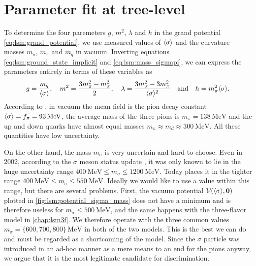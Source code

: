\section{Parameter fit at tree-level}
\label{sec:lsm:parameter_fit}

To determine the four paremeters $g$, $m^2$, $\lambda$ and $h$ in the grand potential \eqref{eq:lsm:grand_potential},
we use measured values of $\langle \sigma \rangle$ and the curvature masses $ m_\sigma$, $m_\pi$ and $m_q$ in vacuum.
Inverting equations \eqref{eq:lsm:ground_state_implicit} and \eqref{eq:lsm:mass_sigmapi},
we can express the parameters entirely in terms of these variables as
\begin{equation}
	g       = \frac{m_q}{\avg{\sigma}}, \quad %
	m^2     = \frac{3m_\pi^2 - m_\sigma^2}{2}, \quad %
	\lambda = \frac{3 m_\sigma^2 - 3 m_\pi^2}{\avg{\sigma}^2} %
	\quad \text{and} \quad
	h       = m_\pi^2 \avg{\sigma}. %
\label{eq:lsm:parameters}
\end{equation}
According to \cite{ref:pdg_review_2021}, in vacuum the mean field is the pion decay constant $\langle \sigma \rangle = f_\pi = \SI{93}{\mega\electronvolt}$,
the average mass of the three pions is $m_\pi = \SI{138}{\mega\electronvolt}$
and the up and down quarks have almost equal masses $m_u \approx m_d \approx \SI{300}{\mega\electronvolt}$.
All these quantities have low uncertainty.


On the other hand, the mass $m_\sigma$ is very uncertain and hard to choose.
Even in 2002, according to the $\sigma$ meson status update \cite{ref:sigma_meson_status},
it was only known to lie in the huge uncertainty range $\SI{400}{\mega\electronvolt} \leq m_\sigma \leq \SI{1200}{\mega\electronvolt}$.
Today \cite{ref:pdg_review_2021} places it in the tighter range $\SI{400}{\mega\electronvolt} \leq m_\sigma \leq \SI{550}{\mega\electronvolt}$.
Ideally we would like to use a value within this range, but there are several problems.
First, the vacuum potential $\mathcal{V}(\langle \sigma \rangle,{\bm{0}})$ plotted in \cref{fig:lsm:potential_sigma_mass} does not have a minimum and is therefore useless for $m_\sigma \leq \SI{500}{\mega\electronvolt}$,
and the same happens with the three-flavor model in \cref{chap:lsm3f}.
We therefore operate with the three common values $m_\sigma = \{600,700,800\} \, \si{\mega\electronvolt}$ in both of the two models.
This is the best we can do and must be regarded as a shortcoming of the model.
Since the $\sigma$ particle was introduced in an ad-hoc manner
as a mere means to an end for the pions anyway,
we argue that it is the most legitimate candidate for discrimination.

